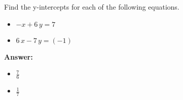  Find the y-intercepts for each of the following equations. \begin{itemize}\item \( -x + 6 \, y = 7 \)\item \( 6 \, x - 7 \, y = \left(-1\right) \)\end{itemize}

        \textbf{Answer:} \begin{itemize}\item \( \frac{7}{6} \)\item \( \frac{1}{7} \)\end{itemize}
